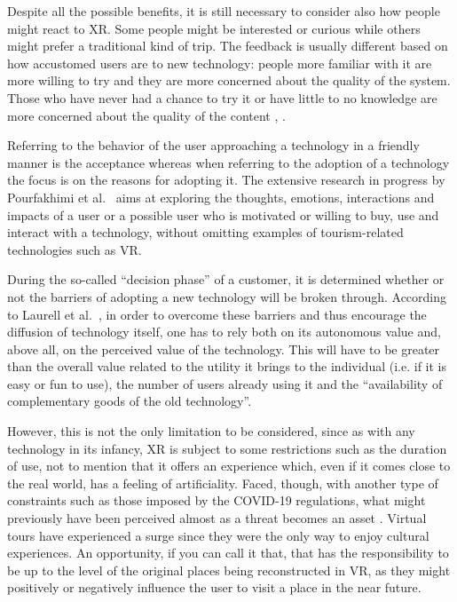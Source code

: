 Despite all the possible benefits, it is still necessary to consider also how people might react to XR. Some people might be interested or curious while others might prefer a traditional kind of trip. The feedback is usually different based on how accustomed users are to new technology: people more familiar with it are more willing to try and they are more concerned about the quality of the system. Those who have never had a chance to try it or have little to no knowledge are more concerned about the quality of the content \cite{bulchand-gidumal_tourists_2020}, \cite{pourfakhimi_acceptance_2020}.

Referring to the behavior of the user approaching a technology in a friendly manner is the acceptance whereas when referring to the adoption of a technology the focus is on the reasons for adopting it. The extensive research in progress by Pourfakhimi et al.~\cite{pourfakhimi_acceptance_2020} aims at exploring the thoughts, emotions, interactions and impacts of a user or a possible user who is motivated or willing to buy, use and interact with a technology, without omitting examples of tourism-related technologies such as VR.

During the so-called “decision phase” of a customer, it is determined whether or not the barriers of adopting a new technology will be broken through. According to Laurell et al.~\cite{laurell_exploring_2019}, in order to overcome these barriers and thus encourage the diffusion of technology itself, one has to rely both on its autonomous value and, above all, on the perceived value of the technology. This will have to be greater than the overall value related to the utility it brings to the individual (i.e. if it is easy or fun to use), the number of users already using it and the “availability of complementary goods of the old technology”. 

However, this is not the only limitation to be considered, since as with any technology in its infancy, XR is subject to some restrictions such as the duration of use, not to mention that it offers an experience which, even if it comes close to the real world, has a feeling of artificiality. Faced, though, with another type of constraints such as those imposed by the COVID-19 regulations, what might previously have been perceived almost as a threat becomes an asset \cite{guttentag_virtual_2020}. Virtual tours have experienced a surge since they were the only way to enjoy cultural experiences. An opportunity, if you can call it that, that has the responsibility to be up to the level of the original places being reconstructed in VR, as they might positively or negatively influence the user to visit a place in the near future. 

